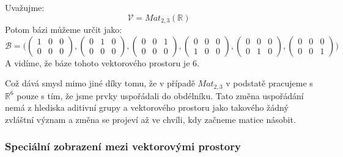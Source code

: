 \begin{example} Uvažujme:
    $$\mathcal{V} = Mat_{2,3}(\mathbb{R})$$
    Potom bázi můžeme určit jako:
    \[
        \mathcal{B} = \Bigg(
            \begin{pmatrix}
                1 & 0 & 0 \\
                0 & 0 & 0
            \end{pmatrix},
            \begin{pmatrix}
                0 & 1 & 0 \\
                0 & 0 & 0
            \end{pmatrix},
            \begin{pmatrix}
                0 & 0 & 1 \\
                0 & 0 & 0
            \end{pmatrix},
            \begin{pmatrix}
                0 & 0 & 0 \\
                1 & 0 & 0
            \end{pmatrix},
            \begin{pmatrix}
                0 & 0 & 0 \\
                0 & 1 & 0
            \end{pmatrix},
            \begin{pmatrix}
                0 & 0 & 0 \\
                0 & 0 & 1
            \end{pmatrix}
            \Bigg)
    \]
    A vidíme, že báze tohoto vektorového prostoru je 6.

    Což dává smysl mimo jiné díky tomu, že v případě $Mat_{2,3}$ v podstatě pracujeme s
    $\mathbb{R}^6$ pouze s tím, že jsme prvky uspořádali do obdélníku. Tato změna uspořádání
    nemá z hlediska aditivní grupy a vektorového prostoru jako takového žádný zvláštní
    význam a změna se projeví až ve chvíli, kdy začneme matice násobit.
\end{example}


\subsubsection{Speciální zobrazení mezi vektorovými prostory}

